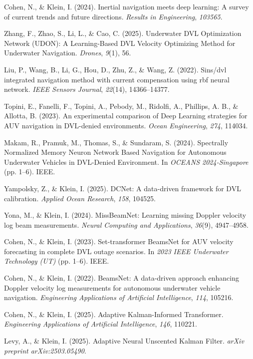 \documentclass{article}
\begin{document}
\begin{thebibliography}{99}
 Cohen, N., \& Klein, I. (2024). Inertial navigation meets deep learning: A survey of current trends and future directions. \textit{Results in Engineering}, \textit{103565}.

 Zhang, F., Zhao, S., Li, L., \& Cao, C. (2025). Underwater DVL Optimization Network (UDON): A Learning-Based DVL Velocity Optimizing Method for Underwater Navigation. \textit{Drones}, \textit{9}(1), 56.

 Liu, P., Wang, B., Li, G., Hou, D., Zhu, Z., \& Wang, Z. (2022). Sins/dvl integrated navigation method with current compensation using rbf neural network. \textit{IEEE Sensors Journal}, \textit{22}(14), 14366–14377.

 Topini, E., Fanelli, F., Topini, A., Pebody, M., Ridolfi, A., Phillips, A. B., \& Allotta, B. (2023). An experimental comparison of Deep Learning strategies for AUV navigation in DVL-denied environments. \textit{Ocean Engineering}, \textit{274}, 114034.

 Makam, R., Pramuk, M., Thomas, S., \& Sundaram, S. (2024). Spectrally Normalized Memory Neuron Network Based Navigation for Autonomous Underwater Vehicles in DVL-Denied Environment. In \textit{OCEANS 2024-Singapore} (pp. 1–6). IEEE.

 Yampolsky, Z., \& Klein, I. (2025). DCNet: A data-driven framework for DVL calibration. \textit{Applied Ocean Research}, \textit{158}, 104525.

 Yona, M., \& Klein, I. (2024). MissBeamNet: Learning missing Doppler velocity log beam measurements. \textit{Neural Computing and Applications}, \textit{36}(9), 4947–4958.

 Cohen, N., \& Klein, I. (2023). Set-transformer BeamsNet for AUV velocity forecasting in complete DVL outage scenarios. In \textit{2023 IEEE Underwater Technology (UT)} (pp. 1–6). IEEE.

 Cohen, N., \& Klein, I. (2022). BeamsNet: A data-driven approach enhancing Doppler velocity log measurements for autonomous underwater vehicle navigation. \textit{Engineering Applications of Artificial Intelligence}, \textit{114}, 105216.

 Cohen, N., \& Klein, I. (2025). Adaptive Kalman-Informed Transformer. \textit{Engineering Applications of Artificial Intelligence}, \textit{146}, 110221.

 Levy, A., \& Klein, I. (2025). Adaptive Neural Unscented Kalman Filter. \textit{arXiv preprint arXiv:2503.05490}.


\end{thebibliography}
\end{document}

